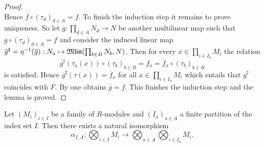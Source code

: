 \begin{proof}
\[  \]
  Hence $\overline{f} \circ (\tau_d)_{d\in A} =f$.
  To finish the induction step it remains to prove uniqueness.
  So let $\overline{g} :  \prod_{d \in A} N_d \to N$ be another multilinear map
  such that $\overline{g} \circ (\tau_d)_{d\in A} =f$  and consider
  the induced linear map
  $\overline{g}^\sharp =\eta^{-1} (\overline{g}) : N_a \mapsto \mathfrak{Mlin} (\prod_{b\in B}N_b, N)$.
  Then for every $x\in \prod_{i\in I_a}M_i$ the relation 
  \[
    \overline{g}^\sharp (\tau_a(x)) \circ (\tau_b)_{b\in B} = f_x =
    \overline{f}_x \circ (\tau_b)_{b\in B} 
  \]
  is satisfied. 
  Hence $\overline{g}^\sharp (\tau(x)) = \overline{f}_x$ for all $x\in \prod_{i\in I_a}M_i$ which entails
  that $\overline{g}^\sharp$ coincides with $F$. By
   one obtains
  $\overline{g} = \overline{f}$. This finishes the induction step and the lemma
  is proved. 
\end{proof}

\begin{proposition}
  Let $(M_i)_{i\in I}$ be a family of $R$-modules and $(I_a)_{a\in A}$ a finite partition of the index set $I$.
  Then there exists a natural isomorphism
  \[
    \alpha_{I,A}: \bigotimes_{i \in I} M_i \to \bigotimes_{a \in A}  \bigotimes_{i \in I_a} M_i .
  \]  
\end{proposition}

